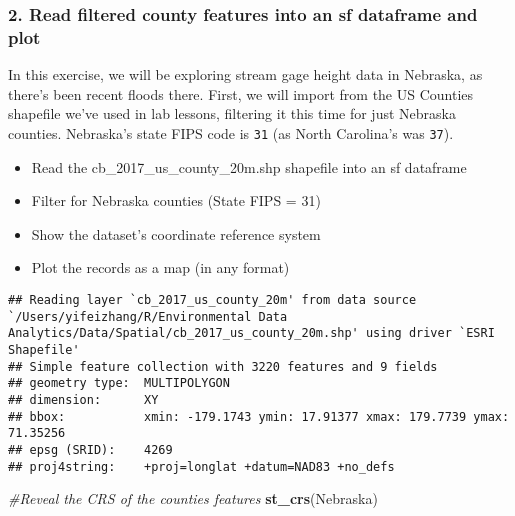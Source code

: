 \documentclass[]{article}
\newenvironment{Shaded}{\begin{snugshade}}{\end{snugshade}}
\newcommand{\KeywordTok}[1]{\textcolor[rgb]{0.13,0.29,0.53}{\textbf{#1}}}
\newcommand{\DecValTok}[1]{\textcolor[rgb]{0.00,0.00,0.81}{#1}}
\newcommand{\StringTok}[1]{\textcolor[rgb]{0.31,0.60,0.02}{#1}}
\newcommand{\CommentTok}[1]{\textcolor[rgb]{0.56,0.35,0.01}{\textit{#1}}}
\newcommand{\OperatorTok}[1]{\textcolor[rgb]{0.81,0.36,0.00}{\textbf{#1}}}
\newcommand{\NormalTok}[1]{#1}
\providecommand{\tightlist}{%
  \setlength{\itemsep}{0pt}\setlength{\parskip}{0pt}}
\begin{document}
\subsubsection{2. Read filtered county features into an sf dataframe and
plot}\label{read-filtered-county-features-into-an-sf-dataframe-and-plot}

In this exercise, we will be exploring stream gage height data in
Nebraska, as there's been recent floods there. First, we will import
from the US Counties\\
shapefile we've used in lab lessons, filtering it this time for just
Nebraska counties. Nebraska's state FIPS code is \texttt{31} (as North
Carolina's was \texttt{37}).

\begin{itemize}
\tightlist
\item
  Read the cb\_2017\_us\_county\_20m.shp shapefile into an sf dataframe
\item
  Filter for Nebraska counties (State FIPS = 31)
\item
  Show the dataset's coordinate reference system
\item
  Plot the records as a map (in any format)
\end{itemize}

\begin{Shaded}
\end{Shaded}

\begin{verbatim}
## Reading layer `cb_2017_us_county_20m' from data source `/Users/yifeizhang/R/Environmental Data Analytics/Data/Spatial/cb_2017_us_county_20m.shp' using driver `ESRI Shapefile'
## Simple feature collection with 3220 features and 9 fields
## geometry type:  MULTIPOLYGON
## dimension:      XY
## bbox:           xmin: -179.1743 ymin: 17.91377 xmax: 179.7739 ymax: 71.35256
## epsg (SRID):    4269
## proj4string:    +proj=longlat +datum=NAD83 +no_defs
\end{verbatim}

\begin{Shaded}
\begin{Highlighting}[]
\CommentTok{#Reveal the CRS of the counties features}
\KeywordTok{st_crs}\NormalTok{(Nebraska)}
\end{Highlighting}
\end{Shaded}
\end{document}
